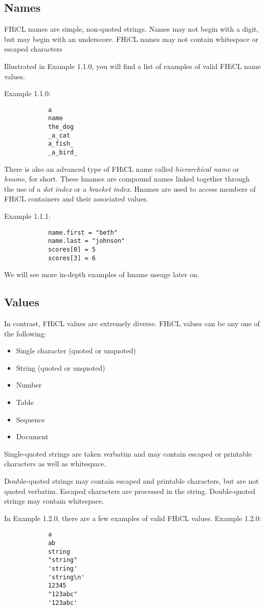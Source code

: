 \documentclass{article}
\begin{document}
        \subsection{Names}
		FHiCL names are simple, non-quoted strings.
		Names may not begin with a digit,
		but may begin with an underscore.
		FHiCL names may not contain whitespace or escaped characters
		\par
		Illustrated in Example 1.1.0,
		you will find a list of examples of valid FHiCL name values.
		\par
		Example 1.1.0:
		\begin{verbatim}
			a
			name
			the_dog
			_a_cat
			a_fish_
			_a_bird_
		\end{verbatim}
		\par
		There is also an advanced type of FHiCL name called 
		\emph{hierarchical name} or \emph{hname}, for short.
		These hnames are compound names linked together through the use of
		a \emph{dot index} or a \emph{bracket index}.
		Hnames are used to access members of FHiCL containers
		and their associated values.
		\par
		Example 1.1.1:
		\begin{verbatim}
			name.first = "beth"
			name.last = "johnson"
			scores[0] = 5
			scores[3] = 6
		\end{verbatim}
		\par
		We will see more in-depth examples of hname useage later on.
	\subsection{Values}
		In contrast, FHiCL values are extremely diverse.
		FHiCL values can be any one of the following:
		\begin{itemize}
			\item Single character (quoted or unquoted)
			\item String (quoted or unquoted)
			\item Number
			\item Table
			\item Sequence
			\item Document
		\end{itemize}
		\par
		Single-quoted strings are taken verbatim
		and may contain escaped or printable characters as well as whitespace.
		\par
		Double-quoted strings may contain escaped and printable characters,
		but are not quoted verbatim. 
		Escaped characters are processed in the string. 
		Double-quoted strings may contain whitespace.
		\par
		In Example 1.2.0, there are a few examples of valid FHiCL values.
		Example 1.2.0:
		\begin{verbatim}
			a
			ab
			string
			"string"
			'string'
			'string\n'
			12345
			"123abc"
			'123abc'
		\end{verbatim}
\end{document}
